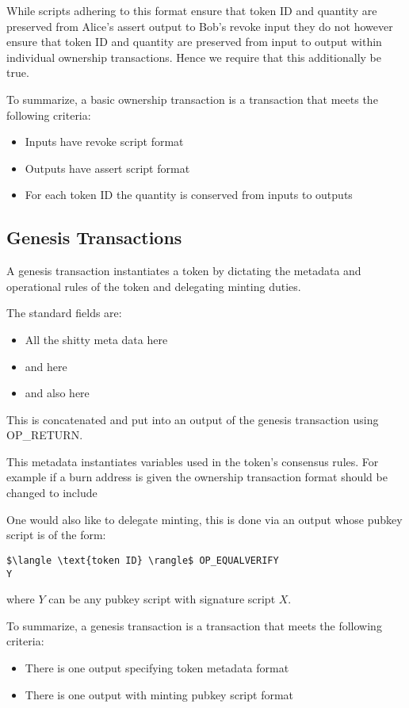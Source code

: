 \documentclass[9pt,oneside]{amsart}
\begin{document}
While scripts adhering to this format ensure that token ID and quantity are preserved from Alice's assert output to Bob's revoke input they do not however ensure that token ID and quantity are preserved from input to output within individual ownership transactions. Hence we require that this additionally be true.

To summarize, a basic ownership transaction is a transaction that meets the following criteria:
\begin{itemize}
    \item Inputs have revoke script format
    \item Outputs have assert script format
    \item For each token ID the quantity is conserved from inputs to outputs
\end{itemize}

\subsection{Genesis Transactions}\label{subsec:gentrans}
A genesis transaction instantiates a token by dictating the metadata and operational rules of the token and delegating minting duties.

The standard fields are:
\begin{itemize}
    \item All the shitty meta data here
    \item and here
    \item and also here
\end{itemize}
This is concatenated and put into an output of the genesis transaction using OP\_RETURN.

This metadata instantiates variables used in the token's consensus rules. For example if a burn address is given the ownership transaction format should be changed to include

One would also like to delegate minting, this is done via an output whose pubkey script is of the form:

\begin{lstlisting}[title={\textbf{Minting PubKey Script}}]
$\langle \text{token ID} \rangle$ OP_EQUALVERIFY
Y
\end{lstlisting}
where $Y$ can be any pubkey script with signature script $X$. 

To summarize, a genesis transaction is a transaction that meets the following criteria:
\begin{itemize}
    \item There is one output specifying token metadata format
    \item There is one output with minting pubkey script format
\end{itemize}
\end{document}
